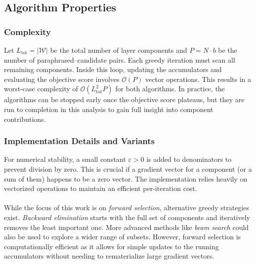 \subsection{Algorithm Properties}

\subsubsection{Complexity}
Let $L_\text{tot}=|\mathcal{W}|$ be the total number of layer components and $P = N \cdot b$ be the number of paraphrased–candidate pairs. Each greedy iteration must scan all remaining components. Inside this loop, updating the accumulators and evaluating the objective score involves $\mathcal{O}(P)$ vector operations. This results in a worst-case complexity of $\mathcal{O}(L_\text{tot}^2 P)$ for both algorithms. In practice, the algorithms can be stopped early once the objective score plateaus, but they are run to completion in this analysis to gain full insight into component contributions.

\subsubsection{Implementation Details and Variants}
For numerical stability, a small constant $\varepsilon > 0$ is added to denominators to prevent division by zero. This is crucial if a gradient vector for a component (or a sum of them) happens to be a zero vector. The implementation relies heavily on vectorized operations to maintain an efficient per-iteration cost.
\\\\
While the focus of this work is on \emph{forward selection}, alternative greedy strategies exist. \emph{Backward elimination} starts with the full set of components and iteratively removes the least important one. More advanced methods like \emph{beam search} could also be used to explore a wider range of subsets. However, forward selection is computationally efficient as it allows for simple updates to the running accumulators without needing to rematerialize large gradient vectors.

